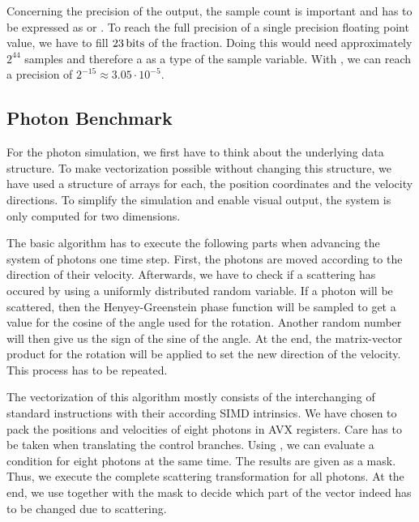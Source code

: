 \documentclass{stdlocal}
\begin{document}
    Concerning the precision of the output, the sample count is important and has to be expressed as  or .
    To reach the full precision of a single precision floating point value, we have to fill $23\, \mathrm{bits}$ of the fraction.
    Doing this would need approximately $2^{44}$ samples and therefore a  as a type of the sample variable.
    With , we can reach a precision of $2^{-15} \approx 3.05\cdot 10^{-5}$.

  \subsection{Photon Benchmark} %
  \label{sub:photon_benchmark}

    For the photon simulation, we first have to think about the underlying data structure.
    To make vectorization possible without changing this structure, we have used a structure of arrays for each, the position coordinates and the velocity directions.
    To simplify the simulation and enable visual output, the system is only computed for two dimensions.

    The basic algorithm has to execute the following parts when advancing the system of photons one time step.
    First, the photons are moved according to the direction of their velocity.
    Afterwards, we have to check if a scattering has occured by using a uniformly distributed random variable.
    If a photon will be scattered, then the Henyey-Greenstein phase function will be sampled to get a value for the cosine of the angle used for the rotation.
    Another random number will then give us the sign of the sine of the angle.
    At the end, the matrix-vector product for the rotation will be applied to set the new direction of the velocity.
    This process has to be repeated.

    The vectorization of this algorithm mostly consists of the interchanging of standard instructions with their according SIMD intrinsics.
    We have chosen to pack the positions and velocities of eight photons in AVX registers.
    Care has to be taken when translating the control branches.
    Using , we can evaluate a condition for eight photons at the same time.
    The results are given as a mask.
    Thus, we execute the complete scattering transformation for all photons.
    At the end, we use  together with the mask to decide which part of the vector indeed has to be changed due to scattering.


\end{document}

